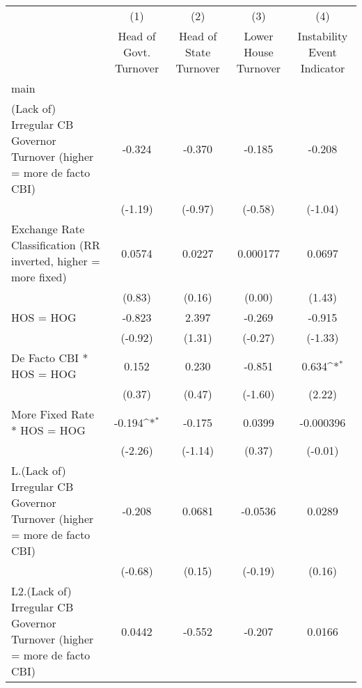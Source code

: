 {
\def\sym#1{\ifmmode^{#1}\else\(^{#1}\)\fi}
\begin{longtable}{l*{4}{c}}
\toprule\endfirsthead\midrule\endhead\midrule\endfoot\endlastfoot
                &\multicolumn{1}{c}{(1)}&\multicolumn{1}{c}{(2)}&\multicolumn{1}{c}{(3)}&\multicolumn{1}{c}{(4)}\\
                &\multicolumn{1}{c}{Head of Govt. Turnover}&\multicolumn{1}{c}{Head of State Turnover}&\multicolumn{1}{c}{Lower House Turnover}&\multicolumn{1}{c}{Instability Event Indicator}\\
\midrule
main            &                  &                  &                  &                  \\
(Lack of) Irregular CB Governor Turnover (higher = more de facto CBI)&   -0.324         &   -0.370         &   -0.185         &   -0.208         \\
                &  (-1.19)         &  (-0.97)         &  (-0.58)         &  (-1.04)         \\
\addlinespace
Exchange Rate Classification (RR inverted, higher = more fixed)&   0.0574         &   0.0227         & 0.000177         &   0.0697         \\
                &   (0.83)         &   (0.16)         &   (0.00)         &   (1.43)         \\
\addlinespace
HOS = HOG       &   -0.823         &    2.397         &   -0.269         &   -0.915         \\
                &  (-0.92)         &   (1.31)         &  (-0.27)         &  (-1.33)         \\
\addlinespace
De Facto CBI * HOS = HOG&    0.152         &    0.230         &   -0.851         &    0.634\sym{*}  \\
                &   (0.37)         &   (0.47)         &  (-1.60)         &   (2.22)         \\
\addlinespace
More Fixed Rate * HOS = HOG&   -0.194\sym{*}  &   -0.175         &   0.0399         &-0.000396         \\
                &  (-2.26)         &  (-1.14)         &   (0.37)         &  (-0.01)         \\
\addlinespace
L.(Lack of) Irregular CB Governor Turnover (higher = more de facto CBI)&   -0.208         &   0.0681         &  -0.0536         &   0.0289         \\
                &  (-0.68)         &   (0.15)         &  (-0.19)         &   (0.16)         \\
\addlinespace
L2.(Lack of) Irregular CB Governor Turnover (higher = more de facto CBI)&   0.0442         &   -0.552         &   -0.207         &   0.0166         \\

\end{longtable}}
